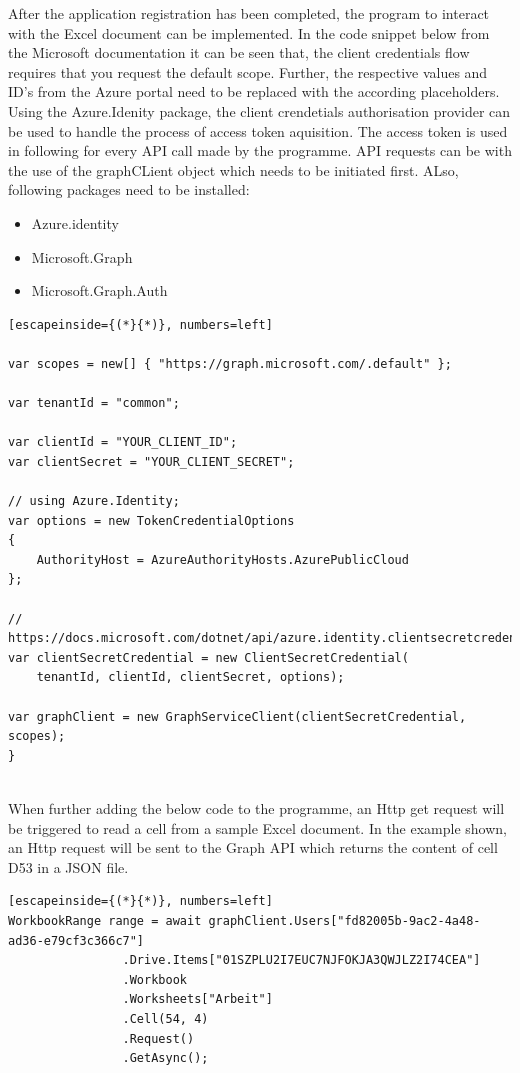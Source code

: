After the application registration has been completed, the program to interact with the Excel document can be implemented. In the code snippet below from the Microsoft documentation it can be seen that, the client credentials flow requires that you request the default scope. Further, the respective values and ID's from the Azure portal need to be replaced with the according placeholders. Using the Azure.Idenity package, the client crendetials authorisation provider can be used to handle the process of access token aquisition. The access token is used in following for every API call made by the programme. API requests can be with the use of the graphCLient object which needs to be initiated first. ALso, following packages need to be installed: 
\begin{itemize}
 \item Azure.identity
 \item Microsoft.Graph
 \item Microsoft.Graph.Auth
\end{itemize}



\begin{lstlisting}[escapeinside={(*}{*)}, numbers=left]

var scopes = new[] { "https://graph.microsoft.com/.default" };

var tenantId = "common";

var clientId = "YOUR_CLIENT_ID";
var clientSecret = "YOUR_CLIENT_SECRET";

// using Azure.Identity;
var options = new TokenCredentialOptions
{
    AuthorityHost = AzureAuthorityHosts.AzurePublicCloud
};

// https://docs.microsoft.com/dotnet/api/azure.identity.clientsecretcredential
var clientSecretCredential = new ClientSecretCredential(
    tenantId, clientId, clientSecret, options);
    
var graphClient = new GraphServiceClient(clientSecretCredential, scopes);
} 
\end{lstlisting}\\

When further adding the below code to the programme, an Http get request will be triggered to read a cell from a sample Excel document. In the example shown, an Http request will be sent to the Graph API which returns the content of cell D53 in a JSON file.  


\begin{lstlisting}[escapeinside={(*}{*)}, numbers=left]
WorkbookRange range = await graphClient.Users["fd82005b-9ac2-4a48-ad36-e79cf3c366c7"]
                .Drive.Items["01SZPLU2I7EUC7NJFOKJA3QWJLZ2I74CEA"]
                .Workbook
                .Worksheets["Arbeit"]
                .Cell(54, 4)
                .Request()
                .GetAsync();
\end{lstlisting}\\

